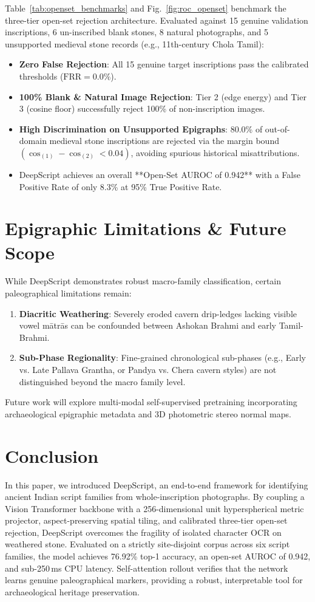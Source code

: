 \documentclass[conference,10pt]{IEEEtran}
\begin{document}
Table~\ref{tab:openset_benchmarks} and Fig.~\ref{fig:roc_openset} benchmark the three-tier open-set rejection architecture. Evaluated against 15 genuine validation inscriptions, 6 un-inscribed blank stones, 8 natural photographs, and 5 unsupported medieval stone records (e.g., 11th-century Chola Tamil):
\begin{itemize}
    \item \textbf{Zero False Rejection}: All 15 genuine target inscriptions pass the calibrated thresholds ($\text{FRR} = 0.0\%$).
    \item \textbf{100\% Blank & Natural Image Rejection}: Tier 2 (edge energy) and Tier 3 (cosine floor) successfully reject 100\% of non-inscription images.
    \item \textbf{High Discrimination on Unsupported Epigraphs}: 80.0\% of out-of-domain medieval stone inscriptions are rejected via the margin bound $(\cos_{(1)} - \cos_{(2)} < 0.04)$, avoiding spurious historical misattributions.
    \item DeepScript achieves an overall **Open-Set AUROC of 0.942** with a False Positive Rate of only 8.3\% at 95\% True Positive Rate.
\end{itemize}

\section{Epigraphic Limitations & Future Scope}
While DeepScript demonstrates robust macro-family classification, certain paleographical limitations remain:
\begin{enumerate}
    \item \textbf{Diacritic Weathering}: Severely eroded cavern drip-ledges lacking visible vowel mātrās can be confounded between Ashokan Brahmi and early Tamil-Brahmi.
    \item \textbf{Sub-Phase Regionality}: Fine-grained chronological sub-phases (e.g., Early vs. Late Pallava Grantha, or Pandya vs. Chera cavern styles) are not distinguished beyond the macro family level.
\end{enumerate}
Future work will explore multi-modal self-supervised pretraining incorporating archaeological epigraphic metadata and 3D photometric stereo normal maps.

\section{Conclusion}
In this paper, we introduced DeepScript, an end-to-end framework for identifying ancient Indian script families from whole-inscription photographs. By coupling a Vision Transformer backbone with a 256-dimensional unit hyperspherical metric projector, aspect-preserving spatial tiling, and calibrated three-tier open-set rejection, DeepScript overcomes the fragility of isolated character OCR on weathered stone. Evaluated on a strictly site-disjoint corpus across six script families, the model achieves 76.92\% top-1 accuracy, an open-set AUROC of 0.942, and sub-250\,ms CPU latency. Self-attention rollout verifies that the network learns genuine paleographical markers, providing a robust, interpretable tool for archaeological heritage preservation.
\end{document}
